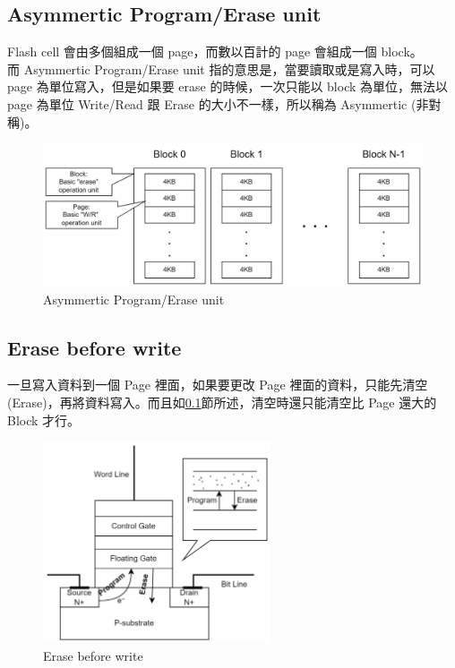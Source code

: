 \subsection{Asymmertic Program/Erase unit}\label{s2.1.2}
\indent
Flash cell 會由多個組成一個 page，而數以百計的 page 會組成一個 block。\\
而 Asymmertic Program/Erase unit 指的意思是，當要讀取或是寫入時，可以 page 為單位寫入，但是如果要 erase 的時候，一次只能以 block 為單位，無法以 page 為單位 Write/Read 跟 Erase 的大小不一樣，所以稱為 Asymmertic (非對稱)。
\begin{figure}[H]
    \centering
    \includegraphics[width=1\textwidth]{picture/ch2/Asymmertic_P-E_unit.png}
    \caption{Asymmertic Program/Erase unit}
    \label{f2.1}
\end{figure}

\subsection{Erase before write}\label{s2.1.3}
\indent
一旦寫入資料到一個 Page 裡面，如果要更改 Page 裡面的資料，只能先清空(Erase)，再將資料寫入。而且如\ref{s2.1.2}節所述，清空時還只能清空比 Page 還大的 Block 才行。\cite{SRFTL}
\begin{figure}[H]
    \centering
    \includegraphics[width=0.6\textwidth]{picture/ch2/erase_before_write.png}
    \caption{Erase before write}
    \label{f2.2}
\end{figure}

